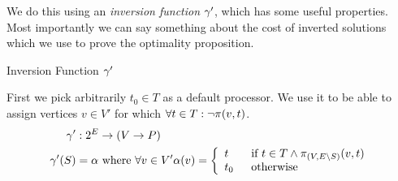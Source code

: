 We do this using an {\em inversion function} $\gamma'$, which has some useful properties.
Most importantly we can say something about the cost of inverted solutions which we use to prove the optimality proposition.

\begin{definition}
Inversion Function $\gamma'$

First we pick arbitrarily $t_0 \in T$ as a default processor.
We use it to be able to assign vertices $v \in V'$ for which $\forall t \in T : \neg\pi_{}(v, t)$.
\begin{align}
	\nonumber \gamma' & : 2^E \rightarrow (V \rightarrow P) \\
	\nonumber \gamma'(S) & = \alpha \mbox{ where } \forall v \in V' \alpha(v) = \mbox{$\left\{ 
		\begin{array}{l l}
			t \quad & \mbox{if $t \in T \wedge \pi_{(V,E \setminus S)}(v, t)$}\\
			t_0 & \mbox{otherwise}\\ \end{array} \right.$} 
\end{align}

\end{definition}

